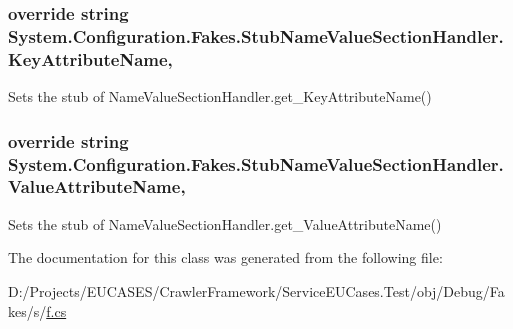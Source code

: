\hypertarget{class_system_1_1_configuration_1_1_fakes_1_1_stub_name_value_section_handler_aadf0b583c4596bd302b8d5c87a6d5ac9}{
\subsubsection[{Key\-Attribute\-Name}]{\setlength{\rightskip}{0pt plus 5cm}override string System.\-Configuration.\-Fakes.\-Stub\-Name\-Value\-Section\-Handler.\-Key\-Attribute\-Name\hspace{0.3cm}{\ttfamily [get]}, {\ttfamily [protected]}}}\label{class_system_1_1_configuration_1_1_fakes_1_1_stub_name_value_section_handler_aadf0b583c4596bd302b8d5c87a6d5ac9}


Sets the stub of Name\-Value\-Section\-Handler.\-get\-\_\-\-Key\-Attribute\-Name()

\hypertarget{class_system_1_1_configuration_1_1_fakes_1_1_stub_name_value_section_handler_ac3a7d31f9c70da374850333257f29b06}{
\subsubsection[{Value\-Attribute\-Name}]{\setlength{\rightskip}{0pt plus 5cm}override string System.\-Configuration.\-Fakes.\-Stub\-Name\-Value\-Section\-Handler.\-Value\-Attribute\-Name\hspace{0.3cm}{\ttfamily [get]}, {\ttfamily [protected]}}}\label{class_system_1_1_configuration_1_1_fakes_1_1_stub_name_value_section_handler_ac3a7d31f9c70da374850333257f29b06}


Sets the stub of Name\-Value\-Section\-Handler.\-get\-\_\-\-Value\-Attribute\-Name()



The documentation for this class was generated from the following file\-:\begin{DoxyCompactItemize}
\item 
D\-:/\-Projects/\-E\-U\-C\-A\-S\-E\-S/\-Crawler\-Framework/\-Service\-E\-U\-Cases.\-Test/obj/\-Debug/\-Fakes/s/\hyperlink{s_2f_8cs}{f.\-cs}\end{DoxyCompactItemize}
